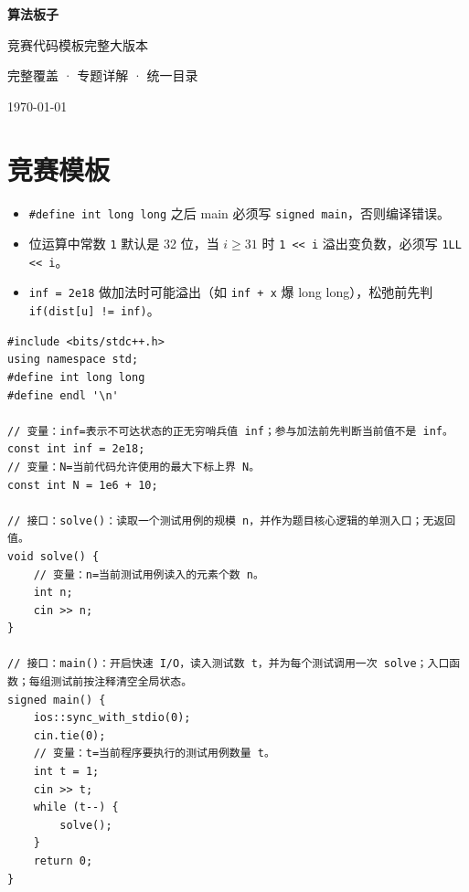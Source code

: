 \documentclass[UTF8,openany,oneside,zihao=-4]{ctexbook}
\newcommand{\inputnewboard}[1]{%
  {%
    \lstset{basicstyle=\newboardcodefont\small}%
  }%
}
\begin{document}
\begin{titlepage}
\centering
\vspace*{3cm}
{\Huge\bfseries 算法板子\par}
\vspace{0.6cm}
{\Large 竞赛代码模板完整大版本\par}
\vspace{1.5cm}
{\normalsize 完整覆盖 · 专题详解 · 统一目录\par}
\vfill
{\large \today\par}
\end{titlepage}
\clearpage

\tableofcontents
\clearpage

\inputnewboard{remake/large/00_总览.tex}

\chapter{竞赛模板}

\begin{warn}
\begin{itemize}
  \item \texttt{\#define int long long} 之后 main 必须写 \texttt{signed main}，否则编译错误。
  \item 位运算中常数 \texttt{1} 默认是 32 位，当 $i \ge 31$ 时 \texttt{1 << i} 溢出变负数，必须写 \texttt{1LL << i}。
  \item \texttt{inf = 2e18} 做加法时可能溢出（如 \texttt{inf + x} 爆 long long），松弛前先判 \texttt{if(dist[u] != inf)}。
\end{itemize}
\end{warn}

\begin{lstlisting}
#include <bits/stdc++.h>
using namespace std;
#define int long long
#define endl '\n'

// 变量：inf=表示不可达状态的正无穷哨兵值 inf；参与加法前先判断当前值不是 inf。
const int inf = 2e18;
// 变量：N=当前代码允许使用的最大下标上界 N。
const int N = 1e6 + 10;

// 接口：solve()：读取一个测试用例的规模 n，并作为题目核心逻辑的单测入口；无返回值。
void solve() {
    // 变量：n=当前测试用例读入的元素个数 n。
    int n;
    cin >> n;
}

// 接口：main()：开启快速 I/O，读入测试数 t，并为每个测试调用一次 solve；入口函数；每组测试前按注释清空全局状态。
signed main() {
    ios::sync_with_stdio(0);
    cin.tie(0);
    // 变量：t=当前程序要执行的测试用例数量 t。
    int t = 1;
    cin >> t;
    while (t--) {
        solve();
    }
    return 0;
}
\end{lstlisting}
\end{document}
